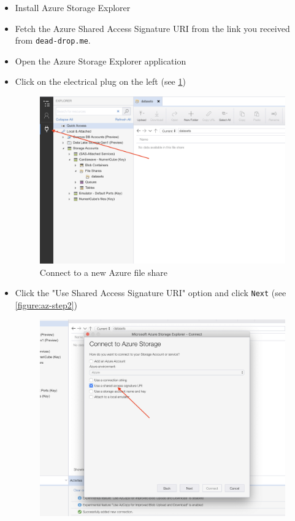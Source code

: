 \begin{itemize}
    \item Install Azure Storage Explorer
    \item Fetch the Azure Shared Access Signature URI from the link you received from \texttt{dead-drop.me}.
    \item Open the Azure Storage Explorer application
    \item Click on the electrical plug on the left (see \ref{figure:az-step1})
        \begin{figure}
        \includegraphics[width=\textwidth]{assets/az-step1.png}
        \caption{Connect to a new Azure file share}
        \label{figure:az-step1}
        \end{figure}
    \item Click the "Use Shared Access Signature URI" option and click \texttt{Next} (see \ref{figure:az-step2})
        \begin{figure}
        \includegraphics[width=\textwidth]{assets/az-step2.png}

\end{figure}
\end{itemize}
